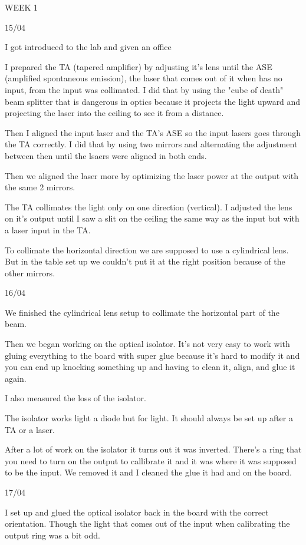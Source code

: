 WEEK 1

15/04

I got introduced to the lab and given an office

I prepared the TA (tapered amplifier) by adjusting it's lens until the ASE (amplified spontaneous  emission), the laser that comes out of it when has no input, from the input was collimated. I did that by using the "cube of death" beam splitter that is dangerous in optics because it projects the light upward and projecting the laser into the ceiling to see it from a distance.

Then I aligned the input laser and the TA's ASE so the input lasers goes through the TA correctly. I did that by using two mirrors and alternating the adjustment between then until the lsaers were aligned in both ends.

Then we aligned the laser more by optimizing the laser power at the output with the same 2 mirrors.

The TA collimates the light only on one direction (vertical). I adjusted the lens on it's output until I saw a slit on the ceiling the same way as the input but with a laser input in the TA.

To collimate the horizontal direction we are supposed to use a cylindrical lens. But in the table set up we couldn't put it at the right position because of the other mirrors.

16/04

We finished the cylindrical lens setup to collimate the horizontal part of the beam.

Then we began working on the optical isolator. It's not very easy to work with gluing everything to the board with super glue because it's hard to modify it and you can end up knocking something up and having to clean it, align, and glue it again. 

I also measured the loss of the isolator. 

The isolator works light a diode but for light. It should always be set up after a TA or a laser.

After a lot of work on the isolator it turns out it was inverted. There's a ring that you need to turn on the output to callibrate it and it was where it was supposed to be the input. We removed it and I cleaned the glue it had and on the board.

17/04

I set up and glued the optical isolator back in the board with the correct orientation. Though the light that comes out of the input when calibrating the output ring was a bit odd.

